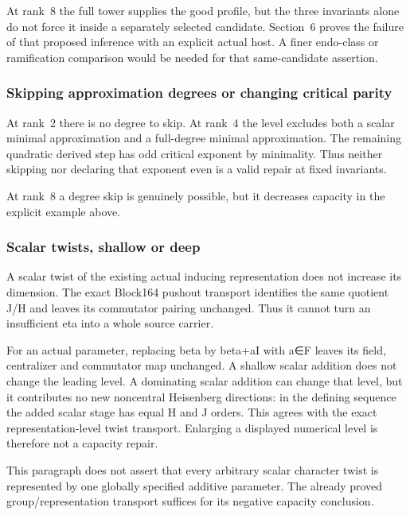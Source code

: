 At rank~8 the full tower supplies the good profile, but the three
invariants alone do not force it inside a separately selected candidate.
Section~6 proves the failure of that proposed inference with an explicit
actual host. A finer endo-class or ramification comparison would be
needed for that same-candidate assertion.

\hypertarget{dyadic_capacity-skipping-approximation-degrees-or-changing-critical-parity}{%
\subsubsection{Skipping approximation degrees or changing critical
parity}\label{dyadic_capacity-skipping-approximation-degrees-or-changing-critical-parity}}

At rank~2 there is no degree to skip. At rank~4 the level excludes both a
scalar minimal approximation and a full-degree minimal approximation.
The remaining quadratic derived step has odd critical exponent by
minimality. Thus neither skipping nor declaring that exponent even is a
valid repair at fixed invariants.

At rank~8 a degree skip is genuinely possible, but it decreases capacity
in the explicit example above.

\hypertarget{dyadic_capacity-scalar-twists-shallow-or-deep}{%
\subsubsection{Scalar twists, shallow or
deep}\label{dyadic_capacity-scalar-twists-shallow-or-deep}}

A scalar twist of the existing actual inducing representation does not
increase its dimension. The exact Block164 pushout transport identifies
the same quotient J/H and leaves its commutator pairing unchanged. Thus
it cannot turn an insufficient eta into a whole source carrier.

For an actual parameter, replacing beta by beta+aI with a∈F leaves its
field, centralizer and commutator map unchanged. A shallow scalar
addition does not change the leading level. A dominating scalar addition
can change that level, but it contributes no new noncentral Heisenberg
directions: in the defining sequence the added scalar stage has equal H
and J orders. This agrees with the exact representation-level twist
transport. Enlarging a displayed numerical level is therefore not a
capacity repair.

This paragraph does not assert that every arbitrary scalar character
twist is represented by one globally specified additive parameter. The
already proved group/representation transport suffices for its negative
capacity conclusion.

